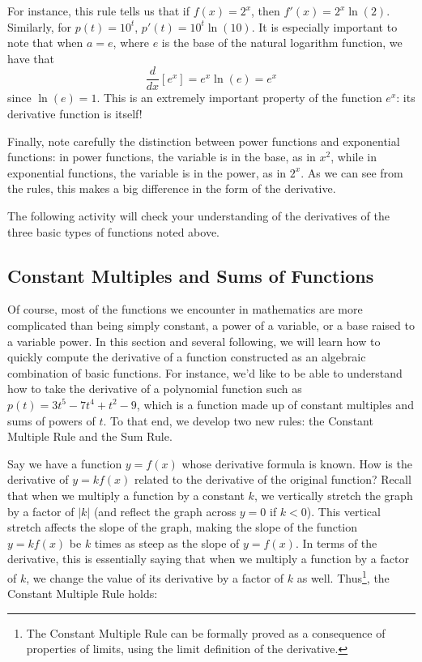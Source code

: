For instance, this rule tells us that if $f(x) = 2^x$, then $f'(x) = 2^x \ln(2)$.  Similarly, for $p(t) = 10^t$, $p'(t) = 10^t \ln(10)$.  It is especially important to note that when $a = e$, where $e$ is the base of the natural logarithm function, we have that 
$$\frac{d}{dx} [e^x] = e^x \ln(e) = e^x$$
since $\ln(e) = 1$.  This is an extremely important property of the function $e^x$:  its derivative function is itself!

Finally, note carefully the distinction between power functions  and exponential functions:  in power functions, the variable is in the base, as in $x^2$, while in exponential functions, the variable is in the power, as in $2^x$.  As we can see from the rules, this makes a big difference in the form of the derivative.

The following activity will check your understanding of the derivatives of the three basic types of functions noted above.



\subsection*{Constant Multiples and Sums of Functions}

Of course, most of the functions we encounter in mathematics are more complicated than being simply constant, a power of a variable, or a base raised to a variable power.  In this section and several following, we will learn how to quickly compute the derivative of a function constructed as an algebraic combination of basic functions.  For instance, we'd like to be able to understand how to take the derivative of a polynomial function such as $p(t) = 3t^5 - 7t^4 + t^2 - 9$, which is a function made up of constant multiples and sums of powers of $t$.  To that end, we develop two new rules:  the Constant Multiple Rule and the Sum Rule.

Say we have a function $y = f(x)$ whose derivative formula is known.  How is the derivative of $y = kf(x)$ related to the derivative of the original function?  Recall that when we multiply a function by a constant $k$, we vertically stretch the graph by a factor of $|k|$ (and reflect the graph across $y = 0$ if $k < 0$).  This vertical stretch affects the slope of the graph, making the slope of the function $y = kf(x)$ be $k$ times as steep as the slope of $y = f(x)$.  In terms of the derivative, this is essentially saying that when we multiply a function by a factor of $k$, we change the value of its derivative by a factor of $k$ as well.  Thus\footnote{The Constant Multiple Rule can be formally proved as a consequence of properties of limits, using the limit definition of the derivative.}, the Constant Multiple Rule holds:

